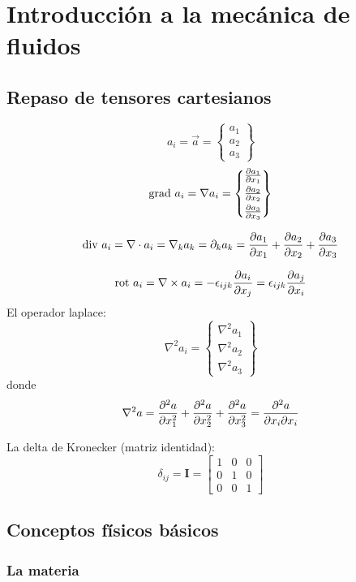 
\section{Introducción a la mecánica de fluidos}
\subsection{Repaso de tensores cartesianos}
\[
a_i =\vec{a}= \begin{Bmatrix}
a_1 \\
a_2 \\
a_3
\end{Bmatrix}%
\]
\[
\gradient a_i=\nabla a_i = 
\begin{Bmatrix}
\vspace{.1cm}\spartial{a_1}{x_1} \\
\vspace{.1cm}\spartial{a_2}{x_2} \\
\spartial{a_3}{x_3}
\end{Bmatrix}%
\]

\[
\textrm{div } a_i = \nabla \cdot a_i=\nabla_k a_k=\partial_k a_k =\frac{\partial a_1}{\partial x_1}+\frac{\partial a_2}{\partial x_2}+\frac{\partial a_3}{\partial x_3}
\]

\[
\textrm{rot } a_i = \nabla \times a_i  = -\epsilon_{ijk} \frac{\partial a_i}{\partial x_j}= \epsilon_{ijk} \frac{\partial a_j}{\partial x_i}
\]
El operador laplace:
\[
\nabla^2 a_i= \begin{Bmatrix}
\nabla^2 a_1 \\
\nabla^2 a_2 \\
\nabla^2 a_3
\end{Bmatrix} 
\]
donde
\[
\nabla^2 a = \frac{\partial^2 a}{\partial x_1 ^2}+\frac{\partial^2 a}{\partial x_2 ^2}+\frac{\partial^2 a}{\partial x_3 ^2}=\frac{\partial^2 a}{\partial x_i \partial x_i} 
\]

La delta de Kronecker (matriz identidad):
\[
\delta_{ij}=\mathbf{I}=\begin{bmatrix}
1 & 0& 0\\
0 & 1 & 0\\
0 & 0 &1
\end{bmatrix}
\]
\subsection{Conceptos físicos básicos}
\subsubsection*{La materia}

